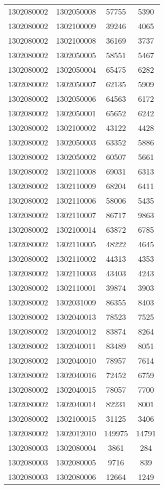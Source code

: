 \begin{longtable}{llcc}
1302080002 & 1302050008 & 57755 & 5390\\
1302080002 & 1302100009 & 39246 & 4065\\
1302080002 & 1302100008 & 36169 & 3737\\
1302080002 & 1302050005 & 58551 & 5467\\
1302080002 & 1302050004 & 65475 & 6282\\
1302080002 & 1302050007 & 62135 & 5909\\
1302080002 & 1302050006 & 64563 & 6172\\
1302080002 & 1302050001 & 65652 & 6242\\
1302080002 & 1302100002 & 43122 & 4428\\
1302080002 & 1302050003 & 63352 & 5886\\
1302080002 & 1302050002 & 60507 & 5661\\
1302080002 & 1302110008 & 69031 & 6313\\
1302080002 & 1302110009 & 68204 & 6411\\
1302080002 & 1302110006 & 58006 & 5435\\
1302080002 & 1302110007 & 86717 & 9863\\
1302080002 & 1302100014 & 63872 & 6785\\
1302080002 & 1302110005 & 48222 & 4645\\
1302080002 & 1302110002 & 44313 & 4353\\
1302080002 & 1302110003 & 43403 & 4243\\
1302080002 & 1302110001 & 39874 & 3903\\
1302080002 & 1302031009 & 86355 & 8403\\
1302080002 & 1302040013 & 78523 & 7525\\
1302080002 & 1302040012 & 83874 & 8264\\
1302080002 & 1302040011 & 83489 & 8051\\
1302080002 & 1302040010 & 78957 & 7614\\
1302080002 & 1302040016 & 72452 & 6759\\
1302080002 & 1302040015 & 78057 & 7700\\
1302080002 & 1302040014 & 82231 & 8001\\
1302080002 & 1302100015 & 31125 & 3406\\
1302080002 & 1302012010 & 149975 & 14791\\
1302080003 & 1302080004 & 3861 & 284\\
1302080003 & 1302080005 & 9716 & 839\\
1302080003 & 1302080006 & 12664 & 1249\\

\end{longtable}
